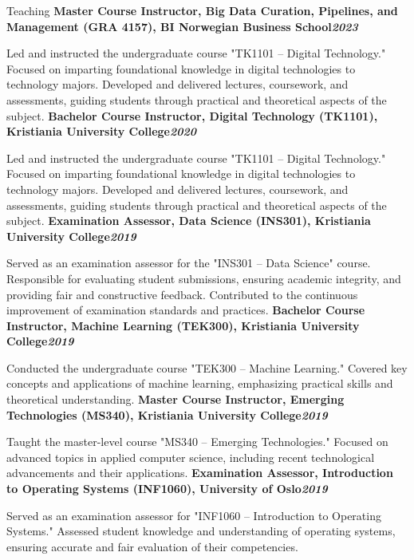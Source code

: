 \begin{rubric}{Teaching}
\entry*[]%
\textbf{Master Course Instructor, Big Data Curation, Pipelines, and Management (GRA 4157), BI Norwegian Business School\hfill\textit{2023}} \par
Led and instructed the undergraduate course "TK1101 – Digital Technology."
Focused on imparting foundational knowledge in digital technologies to technology majors.
Developed and delivered lectures, coursework, and assessments, guiding students through practical and theoretical aspects of the subject.
%
\entry*[]%
\textbf{Bachelor Course Instructor, Digital Technology (TK1101), Kristiania University College\hfill\textit{2020}} \par
Led and instructed the undergraduate course "TK1101 – Digital Technology."
Focused on imparting foundational knowledge in digital technologies to technology majors.
Developed and delivered lectures, coursework, and assessments, guiding students through practical and theoretical aspects of the subject.
%
\entry*[]%
\textbf{Examination Assessor, Data Science (INS301), Kristiania University College\hfill\textit{2019}} \par
Served as an examination assessor for the "INS301 – Data Science" course.
Responsible for evaluating student submissions, ensuring academic integrity, and providing fair and constructive feedback.
Contributed to the continuous improvement of examination standards and practices.
%
\entry*[]%
\textbf{Bachelor Course Instructor, Machine Learning (TEK300), Kristiania University College\hfill\textit{2019}} \par
Conducted the undergraduate course "TEK300 – Machine Learning."
Covered key concepts and applications of machine learning, emphasizing practical skills and theoretical understanding.
%
\entry*[]%
\textbf{Master Course Instructor, Emerging Technologies (MS340), Kristiania University College\hfill\textit{2019}} \par
Taught the master-level course "MS340 – Emerging Technologies."
Focused on advanced topics in applied computer science, including recent technological advancements and their applications.
%
\entry*[]%
\textbf{Examination Assessor, Introduction to Operating Systems (INF1060), University of Oslo\hfill\textit{2019}} \par
Served as an examination assessor for "INF1060 – Introduction to Operating Systems."
Assessed student knowledge and understanding of operating systems, ensuring accurate and fair evaluation of their competencies.
\end{rubric}